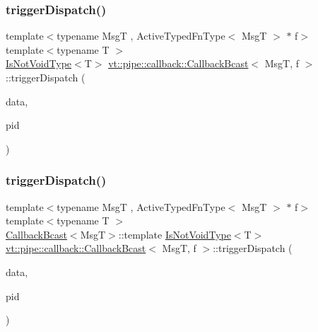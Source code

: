 \subsubsection{\texorpdfstring{trigger\+Dispatch()}{triggerDispatch()}\hspace{0.1cm}{\footnotesize\ttfamily [3/4]}}
{\footnotesize\ttfamily template$<$typename MsgT , Active\+Typed\+Fn\+Type$<$ Msg\+T $>$ $\ast$ f$>$ \\
template$<$typename T $>$ \\
\hyperlink{structvt_1_1pipe_1_1callback_1_1_callback_bcast_a3f5efa2edf7f4c47fe047e086e63a477}{Is\+Not\+Void\+Type}$<$T$>$ \hyperlink{structvt_1_1pipe_1_1callback_1_1_callback_bcast}{vt\+::pipe\+::callback\+::\+Callback\+Bcast}$<$ MsgT, f $>$\+::trigger\+Dispatch (\begin{DoxyParamCaption}\item[{\hyperlink{structvt_1_1pipe_1_1callback_1_1_callback_bcast_aaf994b71056001334d30d74fa9c958f9}{Signal\+Data\+Type} $\ast$}]{data,  }\item[{\hyperlink{namespacevt_ac9852acda74d1896f48f406cd72c7bd3}{Pipe\+Type} const \&}]{pid }\end{DoxyParamCaption})\hspace{0.3cm}{\ttfamily [private]}}

\mbox{\label{structvt_1_1pipe_1_1callback_1_1_callback_bcast_aad21dba24d76c98715a077f8e2b885ff}} 
\subsubsection{\texorpdfstring{trigger\+Dispatch()}{triggerDispatch()}\hspace{0.1cm}{\footnotesize\ttfamily [4/4]}}
{\footnotesize\ttfamily template$<$typename MsgT , Active\+Typed\+Fn\+Type$<$ Msg\+T $>$ $\ast$ f$>$ \\
template$<$typename T $>$ \\
\hyperlink{structvt_1_1pipe_1_1callback_1_1_callback_bcast}{Callback\+Bcast}$<$MsgT$>$\+::template \hyperlink{structvt_1_1pipe_1_1callback_1_1_callback_bcast_a3f5efa2edf7f4c47fe047e086e63a477}{Is\+Not\+Void\+Type}$<$T$>$ \hyperlink{structvt_1_1pipe_1_1callback_1_1_callback_bcast}{vt\+::pipe\+::callback\+::\+Callback\+Bcast}$<$ MsgT, f $>$\+::trigger\+Dispatch (\begin{DoxyParamCaption}\item[{\hyperlink{structvt_1_1pipe_1_1callback_1_1_callback_bcast_aaf994b71056001334d30d74fa9c958f9}{Signal\+Data\+Type} $\ast$}]{data,  }\item[{\hyperlink{namespacevt_ac9852acda74d1896f48f406cd72c7bd3}{Pipe\+Type} const \&}]{pid }\end{DoxyParamCaption})}



